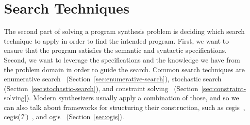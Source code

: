 \section{Search Techniques}
\label{sec:search-techniques}

The second part of solving a program synthesis problem is deciding which search
technique to apply in order to find the intended program.
First, we want to ensure that the program satisfies the semantic and syntactic
specifications.
Second, we want to leverage the specifications and the knowledge we have from
the problem domain in order to guide the search.
Common search techniques are
enumerative search~\cite{Alur:2017:SEP}
(Section~\ref{sec:enumerative-search}),
stochastic search~\cite{Schkufza:2013:SS,Singh:ranking:2015}
(Section~\ref{sec:stochastic-search}), and
constraint solving~\cite{Feng:2018:PSU,Feng:2017:CST,Feng:2017:CSC}
(Section~\ref{sec:constraint-solving}).
Modern synthesizers usually apply a combination of those, and so we can also
talk about frameworks for structuring their construction, such as
\gls{cegis}~\cite{Solar-Lezama:2008},
\gls{cegis}($\mathcal{T}$)~\cite{Abate:2018:CMT}, and
\gls{ogis}~\cite{Jha:2017:TFS}
(Section~\ref{sec:ogis}).


% 





